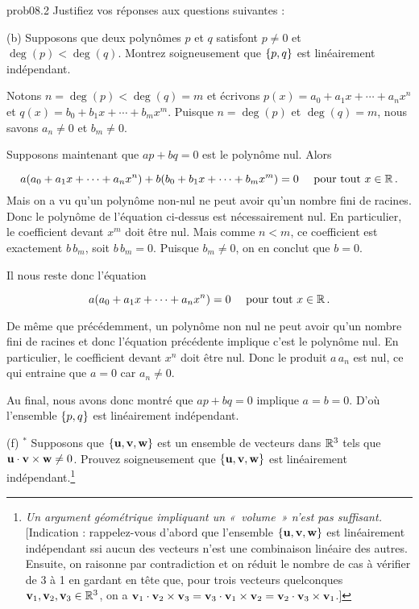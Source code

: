 \bigskip
\begin{sol}{prob08.2} Justifiez vos réponses aux questions suivantes : \medskip
 


(b) Supposons que deux polynômes $p$ et $q$ satisfont $p\not=0$ et $\deg(p) <\deg(q)$. Montrez soigneusement que $\{p,q\}$ est linéairement indépendant.

\soln Notons $n=\deg(p) <\deg(q)=m$ et écrivons $p(x)=a_0+a_1x +\cdots + a_n x^n$ et $q(x)=b_0+b_1x +\cdots + b_m x^m$. Puisque $n=\deg(p) $ et $\deg(q)=m$, nous savons $a_n\not=0$ et $b_m\not= 0$.

Supposons maintenant que $ ap +b q=0$ est le polynôme nul. Alors

$$a(a_0+a_1x +\cdots + a_n x^n) + b(b_0+b_1x +\cdots + b_m x^m)=0 \quad \text{ pour tout } x\in \mathbb{R} \,.$$ 
Mais on a vu qu'un polynôme non-nul ne peut avoir qu'un nombre fini de racines. Donc le polynôme de l'équation ci-dessus est nécessairement nul. En particulier, le coefficient devant $x^m$ doit être nul. Mais comme $n<m$, ce coefficient est exactement $b \,b_m$, soit $b \,b_m=0$. Puisque $b_m\not= 0$, on en conclut que $b=0$. 

Il nous reste donc l'équation

$$a(a_0+a_1x +\cdots + a_n x^n) =0 \quad \text{ pour tout } x\in \mathbb{R} \,.$$

De m\^eme que précédemment, un polynôme non nul ne peut avoir qu'un nombre fini de racines et donc l'équation pr\'ec\'edente implique c'est le polynôme nul. En particulier, le coefficient devant $x^n$ doit être nul. Donc le produit $a \,a_n$ est nul, ce qui entraine que  $a=0$ car $a_n\not=0$. 

Au final, nous avons donc montré que $ ap +b q=0$ implique $a=b=0$. D'o\`u l'ensemble $\{p,q\}$ est linéairement indépendant.

\medskip
 



(f) $^\ast$ Supposons que $\{\mathbf{u},\mathbf{v},\mathbf{w}\}$ est un ensemble de vecteurs dans $\mathbb{R}^3$ tels que $\mathbf{u}\cdot \mathbf{v}\times \mathbf{w} \not=0$. Prouvez soigneusement que $\{\mathbf{u},\mathbf{v},\mathbf{w}\}$ est linéairement indépendant.\footnote{ {\it Un argument géométrique impliquant un «~volume~» n'est pas suffisant.} [Indication : rappelez-vous d'abord que l'ensemble $\{\mathbf{u},\mathbf{v},\mathbf{w}\}$ est linéairement indépendant ssi aucun des vecteurs n'est une combinaison linéaire des autres. Ensuite, on raisonne par contradiction et on réduit le nombre de cas à vérifier de 3 à 1 en gardant en t\^ete que, pour trois vecteurs quelconques $\mathbf{v}_1, \mathbf{v}_2, \mathbf{v}_3 \in \mathbb{R}^3$, on a $\mathbf{v}_1\cdot \mathbf{v}_2\times \mathbf{v}_3=\mathbf{v}_3\cdot \mathbf{v}_1\times \mathbf{v}_2=\mathbf{v}_2\cdot \mathbf{v}_3\times \mathbf{v}_1$.]} 


\end{sol}
